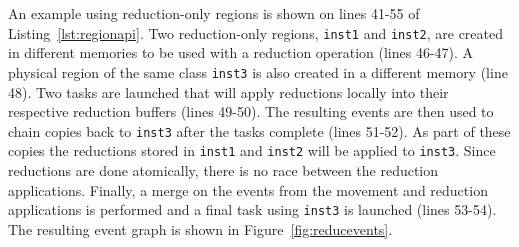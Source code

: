 

An example using reduction-only regions is shown on lines 41-55 of Listing~\ref{lst:regionapi}.
Two reduction-only regions, {\tt inst1} and {\tt inst2}, are created in different memories to
be used with a reduction operation (lines 46-47).  A physical region of the same class {\tt inst3}
is also created in a different memory (line 48).  Two tasks are launched that will apply
reductions locally into their respective reduction buffers (lines 49-50).  The resulting
events are then used to chain copies back to {\tt inst3} after the tasks complete (lines 51-52).  As
part of these copies the reductions stored in {\tt inst1} and {\tt inst2} will be applied
to {\tt inst3}.  Since reductions are done atomically, there is no race between the reduction
applications.  Finally, a merge on the events from the movement and reduction applications is 
performed and a final task using {\tt inst3} is launched (lines 53-54).  The resulting event
graph is shown in Figure~\ref{fig:reducevents}.



